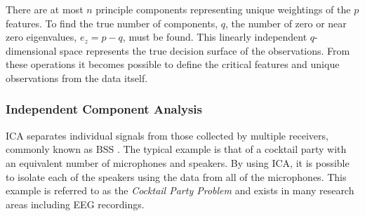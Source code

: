 There are at most $n$ principle components representing unique weightings of the $p$ features. To find the true number of components, $q$, the number of zero or near zero eigenvalues, $e_{z}=p-q$, must be found. This linearly independent $q$-dimensional space represents the true decision surface of the observations. From these operations it becomes possible to define the critical features and unique observations from the data itself.

\subsubsection{Independent Component Analysis}

\ac{ICA} separates individual signals from those collected by multiple receivers, commonly known as \ac{BSS} \cite{Hyvarinen2001}. The typical example is that of a cocktail party with an equivalent number of microphones and speakers. By using \ac{ICA}, it is possible to isolate each of the speakers using the data from all of the microphones. This example is referred to as the \textit{Cocktail Party Problem} and exists in many research areas including \ac{EEG} recordings.

